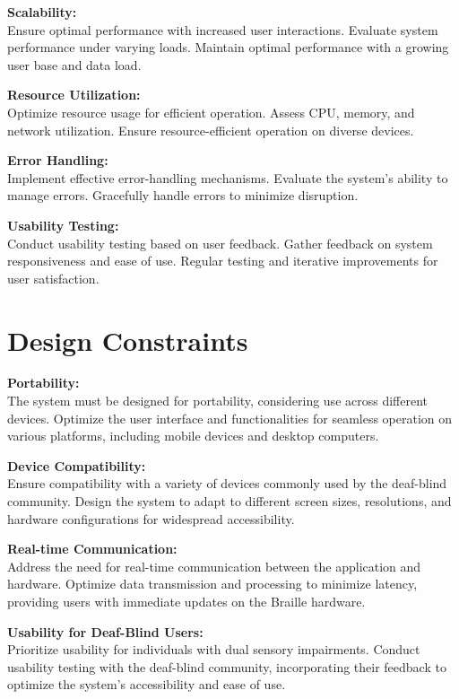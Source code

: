 \documentclass[12pt,a4paper]{report}
\begin{document}
\noindent\textbf{Scalability:}\\
Ensure optimal performance with increased user interactions. Evaluate system performance under varying loads. Maintain optimal performance with a growing user base and data load.

\noindent\textbf{Resource Utilization:}\\
Optimize resource usage for efficient operation. Assess CPU, memory, and network utilization. Ensure resource-efficient operation on diverse devices.

\noindent\textbf{Error Handling:}\\
Implement effective error-handling mechanisms. Evaluate the system's ability to manage errors. Gracefully handle errors to minimize disruption.

\noindent\textbf{Usability Testing:}\\
Conduct usability testing based on user feedback. Gather feedback on system responsiveness and ease of use. Regular testing and iterative improvements for user satisfaction. 


\section{Design Constraints}
\textbf{Portability:}\\
The system must be designed for portability, considering use across different devices. Optimize the user interface and functionalities for seamless operation on various platforms, including mobile devices and desktop computers.

\noindent\textbf{Device Compatibility:}\\
Ensure compatibility with a variety of devices commonly used by the deaf-blind community. Design the system to adapt to different screen sizes, resolutions, and hardware configurations for widespread accessibility.

\noindent\textbf{Real-time Communication:}\\
Address the need for real-time communication between the application and hardware. Optimize data transmission and processing to minimize latency, providing users with immediate updates on the Braille hardware.

\noindent\textbf{Usability for Deaf-Blind Users:}\\
Prioritize usability for individuals with dual sensory impairments. Conduct usability testing with the deaf-blind community, incorporating their feedback to optimize the system's accessibility and ease of use. 
\end{document}
